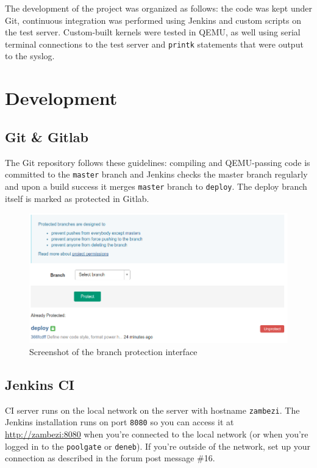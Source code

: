 \documentclass[]{report}
\begin{document}
The development of the project was organized as follows: the code was
kept under Git, continuous integration was performed using Jenkins and
custom scripts on the test server. Custom-built kernels were tested in
QEMU, as well using serial terminal connections to the test server and
\lstinline!printk! statements that were output to the syslog.

\section{Development}\label{development}

\subsection{Git \& Gitlab}\label{git-gitlab}

The Git repository follows these guidelines: compiling and QEMU-passing
code is committed to the \lstinline!master! branch and Jenkins checks
the master branch regularly and upon a build success it merges
\lstinline!master! branch to \lstinline!deploy!. The deploy branch
itself is marked as protected in Gitlab.

\begin{figure}[htbp]
\centering
\includegraphics{img/protected-branch.png}
\caption{Screenshot of the branch protection interface}
\end{figure}

\subsection{Jenkins CI}\label{jenkins-ci}

CI server runs on the local network on the server with hostname
\lstinline!zambezi!. The Jenkins installation runs on port
\lstinline!8080! so you can access it at \url{http://zambezi:8080} when
you're connected to the local network (or when you're logged in to the
\lstinline!poolgate! or \lstinline!deneb!). If you're outside of the
network, set up your connection as described in the forum post message
\#16.
\end{document}

